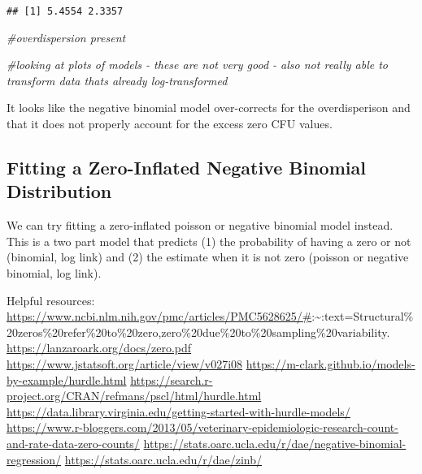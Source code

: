 \documentclass[
]{article}
\newenvironment{Shaded}{\begin{snugshade}}{\end{snugshade}}
\newcommand{\CommentTok}[1]{\textcolor[rgb]{0.56,0.35,0.01}{\textit{#1}}}
\begin{document}
\begin{verbatim}
## [1] 5.4554 2.3357
\end{verbatim}

\begin{Shaded}
\begin{Highlighting}[]
\CommentTok{\#overdispersion present }

\CommentTok{\#looking at plots of models {-} these are not very good {-} also not really able to transform data that\textquotesingle{}s already log{-}transformed}
\end{Highlighting}
\end{Shaded}

It looks like the negative binomial model over-corrects for the
overdisperison and that it does not properly account for the excess zero
CFU values.

\hypertarget{fitting-a-zero-inflated-negative-binomial-distribution}{%
\subsection{Fitting a Zero-Inflated Negative Binomial
Distribution}\label{fitting-a-zero-inflated-negative-binomial-distribution}}

We can try fitting a zero-inflated poisson or negative binomial model
instead. This is a two part model that predicts (1) the probability of
having a zero or not (binomial, log link) and (2) the estimate when it
is not zero (poisson or negative binomial, log link).

Helpful resources:
\url{https://www.ncbi.nlm.nih.gov/pmc/articles/PMC5628625/\#}:\textasciitilde:text=Structural\%20zeros\%20refer\%20to\%20zero,zero\%20due\%20to\%20sampling\%20variability.
\url{https://lanzaroark.org/docs/zero.pdf}
\url{https://www.jstatsoft.org/article/view/v027i08}
\url{https://m-clark.github.io/models-by-example/hurdle.html}
\url{https://search.r-project.org/CRAN/refmans/pscl/html/hurdle.html}
\url{https://data.library.virginia.edu/getting-started-with-hurdle-models/}
\url{https://www.r-bloggers.com/2013/05/veterinary-epidemiologic-research-count-and-rate-data-zero-counts/}
\url{https://stats.oarc.ucla.edu/r/dae/negative-binomial-regression/}
\url{https://stats.oarc.ucla.edu/r/dae/zinb/}
\end{document}
